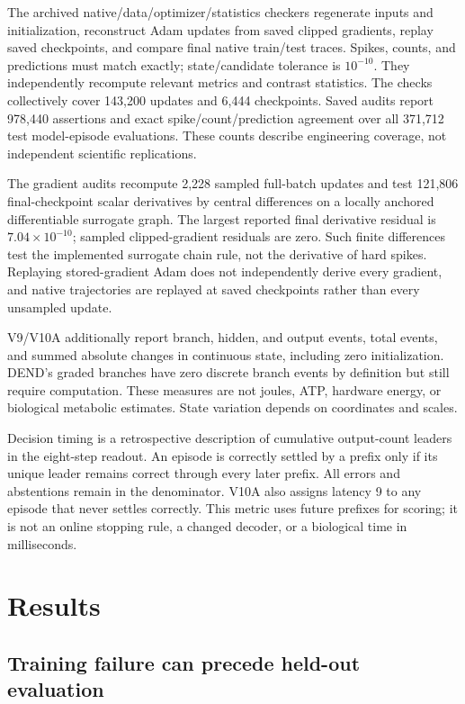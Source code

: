 \documentclass[
  10pt,
]{article}
\begin{document}
The archived native/data/optimizer/statistics checkers regenerate inputs
and initialization, reconstruct Adam updates from saved clipped
gradients, replay saved checkpoints, and compare final native train/test
traces. Spikes, counts, and predictions must match exactly;
state/candidate tolerance is \(10^{-10}\). They independently recompute
relevant metrics and contrast statistics. The checks collectively cover
143,200 updates and 6,444 checkpoints. Saved audits report 978,440
assertions and exact spike/count/prediction agreement over all 371,712
test model-episode evaluations. These counts describe engineering
coverage, not independent scientific replications.

The gradient audits recompute 2,228 sampled full-batch updates and test
121,806 final-checkpoint scalar derivatives by central differences on a
locally anchored differentiable surrogate graph. The largest reported
final derivative residual is \(7.04\times10^{-10}\); sampled
clipped-gradient residuals are zero. Such finite differences test the
implemented surrogate chain rule, not the derivative of hard spikes.
Replaying stored-gradient Adam does not independently derive every
gradient, and native trajectories are replayed at saved checkpoints
rather than every unsampled update.

V9/V10A additionally report branch, hidden, and output events, total
events, and summed absolute changes in continuous state, including zero
initialization. DEND's graded branches have zero discrete branch events
by definition but still require computation. These measures are not
joules, ATP, hardware energy, or biological metabolic estimates. State
variation depends on coordinates and scales.

Decision timing is a retrospective description of cumulative
output-count leaders in the eight-step readout. An episode is correctly
settled by a prefix only if its unique leader remains correct through
every later prefix. All errors and abstentions remain in the
denominator. V10A also assigns latency 9 to any episode that never
settles correctly. This metric uses future prefixes for scoring; it is
not an online stopping rule, a changed decoder, or a biological time in
milliseconds.

\section{Results}\label{results}

\subsection{Training failure can precede held-out
evaluation}\label{training-failure-can-precede-held-out-evaluation}
\end{document}
